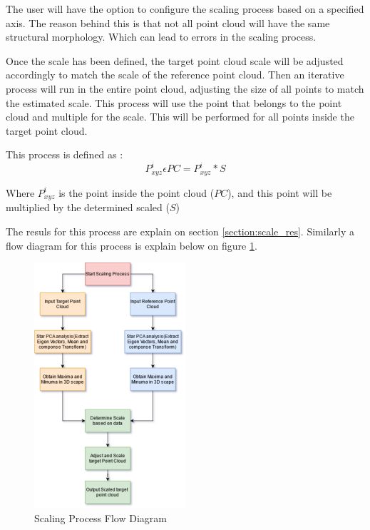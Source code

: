 \documentclass[12pt]{report}
\begin{document}
The user will have the option to configure the scaling process based on a specified axis. The reason behind this is that not all point cloud will have the same structural morphology.
Which can lead to errors in the scaling process.

Once the scale has been defined, the target point cloud scale will be adjusted accordingly to match the scale of the reference point cloud.
Then an iterative process will run in the entire point cloud, adjusting the size of all points to match the estimated scale. 
This process will use the point that belongs to the point cloud and multiple for the scale. This will be performed for all points inside the target point cloud.

This process is defined as :
\begin{equation}
  P_{xyz} ^i \epsilon PC = P_{xyz} ^i * S
  \label{equ:scale_process_eque}
\end{equation}

Where $P_{xyz} ^i$ is the point inside the point cloud ($PC$), and this point will be multiplied by the determined scaled ($S$)

The resuls  for this process are explain on section \ref{section:scale_res}. Similarly a flow diagram for this process is explain below on figure \ref{fig:scaling_flow}.


\begin{figure}[H]%
  \centering
 \includegraphics[width=0.5\textwidth]{scaling_flow.png}
\caption{Scaling Process Flow Diagram}
\label{fig:scaling_flow} 
\end{figure}
\end{document}
